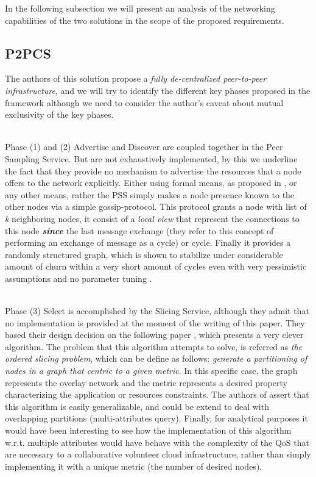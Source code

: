 \documentclass[11pt]{amsart}
\begin{document}
        In the following subsection we will present an analysis of the networking
        capabilities of the two solutions in the scope of the proposed requirements.
	
        \subsection{P2PCS}
        The authors of this solution propose a \emph{fully de-centralized peer-to-peer
          infrastructure}, and we will try to identify the different key phases proposed
        in the framework although we need to consider the author's caveat about mutual
        exclusivity of the key phases.
        
        \\ Phase (1) and (2) {Advertise and Discover} are coupled together in the Peer
        Sampling Service. But are not exhaustively implemented, by this we underline the
        fact that they provide no mechanism to advertise the resources that a node offers
        to the network explicitly. Either using formal means, as proposed in
        \cite{p2p_collab}, or any other means, rather the PSS simply makes a node presence
        known to the other nodes via a simple gossip-protocol. This protocol grants a node
        with list of \emph{k} neighboring nodes, it consist of a \emph{local view} that
        represent the connections to this node \emph{\textbf{since}} the last message
        exchange (they refer to this concept of performing an exchange of message as a
        cycle) or cycle. Finally it provides a randomly structured graph, which is shown
        to stabilize under considerable amount of churn within a very short amount of
        cycles even with very pessimistic assumptions and no parameter tuning \cite{pss}.

        \\ Phase (3) {Select} is accomplished by the Slicing Service, although they admit
        that no implementation is provided at the moment of the writing of this
        paper. They based their design decision on the following paper
        \cite{jelasity2006ordered}, which presents a very clever algorithm. The problem
        that this algorithm attempts to solve, is referred as \emph{the ordered slicing
          problem}, which can be define as follows: \emph{generate a partitioning of nodes
          in a graph that centric to a given metric}. In this specific case, the graph
        represents the overlay network and the metric represents a desired property
        characterizing the application or resources constraints. The authors of
        \cite{jelasity2006ordered} assert that this algorithm is easily generalizable, and
        could be extend to deal with overlapping partitions (multi-attributes
        query). Finally, for analytical purposes it would have been interesting to see how
        the implementation of this algorithm w.r.t. multiple attributes would have behave
        with the complexity of the QoS that are necessary to a collaborative volunteer
        cloud infrastructure, rather than simply implementing it with a unique metric (the
        number of desired nodes).
\end{document}
